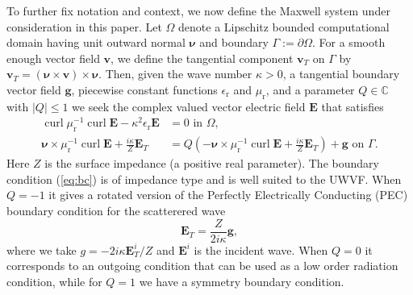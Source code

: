 \documentclass[a4paper,12pt]{article}
\newcommand{\bfE}{\mathbf{E}}
\newcommand{\bfnu}{\boldsymbol{\nu}}
\newcommand{\bfg}{\mathbf{g}}
\newcommand{\bfv}{\mathbf{v}}
\DeclareMathOperator{\curl}{curl}
\newcommand{\epsr}{\epsilon_{\mathrm{r}}}
\newcommand{\mur}{\mu_{\mathrm{r}}}
\begin{document}
To further fix notation and context, we now define the Maxwell system
under consideration in this paper. Let $\Omega$ denote a Lipschitz
bounded computational domain having unit outward normal $\bfnu$ and
boundary $\Gamma:=\partial\Omega$. For a smooth enough vector field
$\bfv$, we define the tangential component $\bfv_T$ on $\Gamma$ by
$\bfv_T=(\bfnu\times\bfv)\times\bfnu$.  Then, given the wave number
$\kappa>0$, a tangential boundary vector field $\bfg$, piecewise
constant functions $\epsr$ and $\mur$, and a parameter
$Q\in\mathbb{C}$ with $|Q|\leq 1$ we seek the complex valued vector
electric field $\bfE$ that satisfies
\begin{subequations}
\begin{align}
\curl\mur^{-1}\curl \bfE-\kappa^2\epsr\bfE&=0\mbox{ in }\Omega,\label{eq:maxwell}\\
\bfnu\times\mur^{-1}\curl \bfE+\frac{i\kappa}{Z}\bfE_T&=Q\left(-\bfnu\times\mur^{-1}\curl \bfE+\frac{i\kappa}{Z}\bfE_T\right)+\bfg\mbox{ on }\Gamma.
\label{eq:bc}
\end{align}
\end{subequations}
Here $Z$ is the surface impedance (a positive real parameter).  The
boundary condition (\ref{eq:bc}) is of impedance type and is well
suited to the UWVF.  When $Q=-1$ it gives a rotated version of the
Perfectly Electrically Conducting (PEC) boundary condition for the
scatterered wave
\[
\bfE_T=\frac{Z}{2i\kappa}\bfg,
\]
where we take $g=-2i\kappa\bfE^i_T/Z$ and $\bfE^i$ is the incident
wave.  When $Q=0$ it corresponds to an outgoing condition that can be
used as a low order radiation condition, while for $Q=1$ we have a
symmetry boundary condition.
\end{document}
